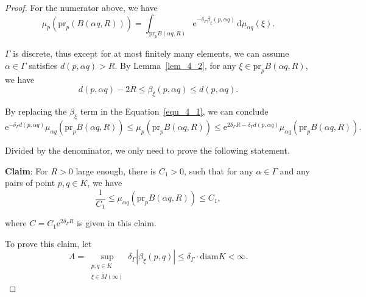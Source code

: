 \documentclass[reqno,11pt]{article}
\theoremstyle{definition}
\theoremstyle{remark}
\numberwithin{equation}{section}
\begin{document}
\begin{proof}
	For the numerator above, we have
	\begin{equation}\label{equ_4_1}
		\mu_p(\text{pr}_p(B(\alpha q,R)))=\int_{\text{pr}_p B(\alpha q,R)}\mathrm{e}^{-\delta_\Gamma\beta_\xi(p,\alpha q)}\,\mathrm{d}\mu_{\alpha q}(\xi).
	\end{equation}

	$\Gamma$ is discrete, thus except for at most finitely many elements, we can assume $\alpha\in\Gamma$ satisfies $d(p,\alpha q)>R$. By Lemma~\ref{lem_4_2}, for any $\xi\in\text{pr}_p B(\alpha q,R)$, we have
	\begin{displaymath}
		d(p,\alpha q)-2R\leq\beta_{\xi}(p,\alpha q)\leq d(p,\alpha q).
	\end{displaymath}

	By replacing the $\beta_{\xi}$ term in the Equation~\ref{equ_4_1}, we can conclude
	\begin{displaymath}
		\mathrm{e}^{-\delta_{\Gamma}d(p,\alpha q)}\mu_{\alpha q}(\text{pr}_p B(\alpha q,R))\leq\mu_p(\text{pr}_p B(\alpha q,R))\leq\mathrm{e}^{2\delta_\Gamma R-\delta_\Gamma d(p,\alpha q)}\mu_{\alpha q}(\text{pr}_p B(\alpha q,R)).
	\end{displaymath}

	Divided by the denominator, we only need to prove the following statement.

	\textbf{Claim}: For $R>0$ large enough, there is $C_1>0$, such that for any $\alpha\in\Gamma$ and any pairs of point $p,q\in K$, we have
	\begin{displaymath}
		\frac{1}{C_1}\leq\mu_{\alpha q}(\text{pr}_p B(\alpha q, R))\leq C_1,
	\end{displaymath}

	where $C=C_1\mathrm{e}^{2\delta_\Gamma R}$ is given in this claim.

	To prove this claim, let
	\begin{displaymath}
		A=\sup_{\substack{p,q\in K\\ \xi\in\widetilde{M}(\infty)}}\delta_\Gamma |\beta_{\xi}(p,q)|\leq\delta_\Gamma\cdot\text{diam}{K}<\infty.
	\end{displaymath}


\end{proof}
\end{document}
